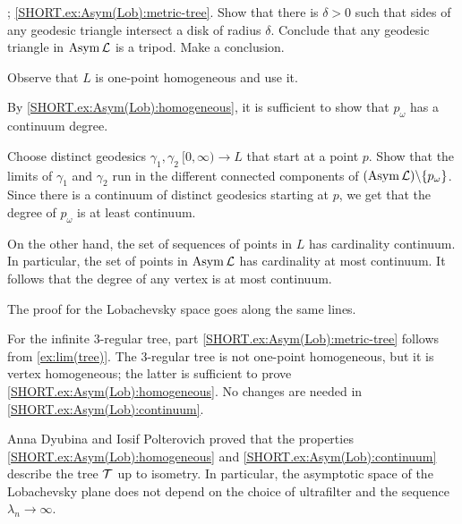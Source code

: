 \parbf{\ref{ex:Asym(Lob)}}; \ref{SHORT.ex:Asym(Lob):metric-tree}.
Show that there is $\delta>0$ such that sides of any geodesic triangle intersect a disk of radius $\delta$.
Conclude that any geodesic triangle in $\mathop{\rm Asym}\nolimits\mathcal{L}$ is a tripod.
Make a conclusion.

 Observe that $L$ is one-point homogeneous and use it.

By \ref{SHORT.ex:Asym(Lob):homogeneous}, it is sufficient to show that $p_\omega$ has a continuum degree.

Choose distinct geodesics $\gamma_1,\gamma_2\:[0,\infty)\to L$ that start at a point $p$.
Show that the limits of $\gamma_1$ and $\gamma_2$ run in the different connected components of $(\mathop{\rm Asym}\nolimits\mathcal{L})\backslash \{p_\omega\}$.
Since there is a continuum of distinct geodesics starting at $p$,
we get that the degree of $p_\omega$ is at least continuum.

On the other hand, the set of sequences of points in $L$  has cardinality continuum.
In particular, the set of points in $\mathop{\rm Asym}\nolimits\mathcal{L}$ has cardinality at most continuum.
It follows that the degree of any vertex is at most continuum.

The proof for the Lobachevsky space goes along the same lines.

For the infinite 3-regular tree, part \ref{SHORT.ex:Asym(Lob):metric-tree} follows from \ref{ex:lim(tree)}.
The 3-regular tree is not one-point homogeneous, but it is vertex homogeneous; the latter is sufficient to prove \ref{SHORT.ex:Asym(Lob):homogeneous}.
No changes are needed in \ref{SHORT.ex:Asym(Lob):continuum}.

Anna Dyubina and Iosif Polterovich \cite{dyubina-polterovich} proved that the properties \ref{SHORT.ex:Asym(Lob):homogeneous} and \ref{SHORT.ex:Asym(Lob):continuum} describe the tree $\mathcal{T}$ up to isometry.
In particular, the asymptotic space of the Lobachevsky plane does not depend on the choice of ultrafilter and the sequence $\lambda_n\to \infty$.
